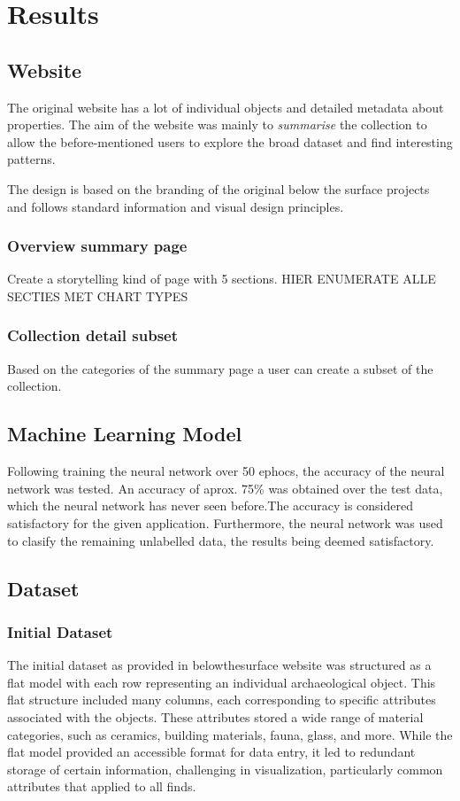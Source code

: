 \section{Results}

\subsection{Website}

The original website has a lot of individual objects and detailed metadata about properties. The aim of the website was mainly to \textit{summarise} the collection to allow the before-mentioned users to explore the broad dataset and find interesting patterns.

The design is based on the branding of the original below the surface projects and follows standard information and visual design principles.

\subsubsection{Overview summary page}
Create a storytelling kind of page with 5 sections. HIER ENUMERATE ALLE SECTIES MET CHART TYPES

\subsubsection{Collection detail subset}
Based on the categories of the summary page a user can create a subset of the collection.

\subsection{Machine Learning Model}
Following training the neural network over 50 ephocs, the accuracy of the neural network was tested. An accuracy of aprox. 75\% was obtained over the test data, which the neural network has never seen before.The accuracy is considered satisfactory for the given application. Furthermore, the neural network was used to clasify the remaining unlabelled data, the results being deemed satisfactory.

\subsection{Dataset}

\subsubsection{Initial Dataset}
The initial dataset as provided in belowthesurface website was structured as a flat model with each row representing an individual archaeological object. This flat structure included many columns, each corresponding to specific attributes associated with the objects. These attributes stored a wide range of material categories, such as ceramics, building materials, fauna, glass, and more. While the flat model provided an accessible format for data entry, it led to redundant storage of certain information, challenging in visualization, particularly common attributes that applied to all finds.

